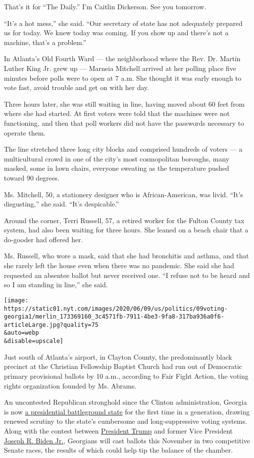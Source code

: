 That's it for ``The Daily.'' I'm Caitlin Dickerson. See you tomorrow.

``It's a hot mess,'' she said. ``Our secretary of state has not
adequately prepared us for today. We knew today was coming. If you show
up and there's not a machine, that's a problem.''

In Atlanta's Old Fourth Ward --- the neighborhood where the Rev. Dr.
Martin Luther King Jr. grew up --- Marneia Mitchell arrived at her
polling place five minutes before polls were to open at 7 a.m. She
thought it was early enough to vote fast, avoid trouble and get on with
her day.

Three hours later, she was still waiting in line, having moved about 60
feet from where she had started. At first voters were told that the
machines were not functioning, and then that poll workers did not have
the passwords necessary to operate them.

The line stretched three long city blocks and comprised hundreds of
voters --- a multicultural crowd in one of the city's most cosmopolitan
boroughs, many masked, some in lawn chairs, everyone sweating as the
temperature pushed toward 90 degrees.

Ms. Mitchell, 50, a stationery designer who is African-American, was
livid. ``It's disgusting,'' she said. ``It's despicable.''

Around the corner, Terri Russell, 57, a retired worker for the Fulton
County tax system, had also been waiting for three hours. She leaned on
a beach chair that a do-gooder had offered her.

Ms. Russell, who wore a mask, said that she had bronchitis and asthma,
and that she rarely left the house even when there was no pandemic. She
said she had requested an absentee ballot but never received one. ``I
refuse not to be heard and so I am standing in line,'' she said.

\texttt{[image: https://static01.nyt.com/images/2020/06/09/us/politics/09voting-georgia1/merlin\_173369160\_3c4571fb-7911-4be3-9fa8-317ba936a0f6-articleLarge.jpg?quality=75\\\&auto=webp\\\&disable=upscale]}

Just south of Atlanta's airport, in Clayton County, the predominantly
black precinct at the Christian Fellowship Baptist Church had run out of
Democratic primary provisional ballots by 10 a.m., according to Fair
Fight Action, the voting rights organization founded by Ms. Abrams.

An uncontested Republican stronghold since the Clinton administration,
Georgia is now
\href{https://www.nytimes.com/2020/06/09/us/politics/georgia-primary-election-senate-race-jon-ossoff.html}{a
presidential battleground state} for the first time in a generation,
drawing renewed scrutiny to the state's cumbersome and long-suppressive
voting systems. Along with the contest between
\href{https://www.nytimes.com/interactive/2020/us/elections/donald-trump.html}{President
Trump} and former Vice President
\href{https://www.nytimes.com/interactive/2020/us/elections/joe-biden.html}{Joseph
R. Biden Jr.}, Georgians will cast ballots this November in two
competitive Senate races, the results of which could help tip the
balance of the chamber.

